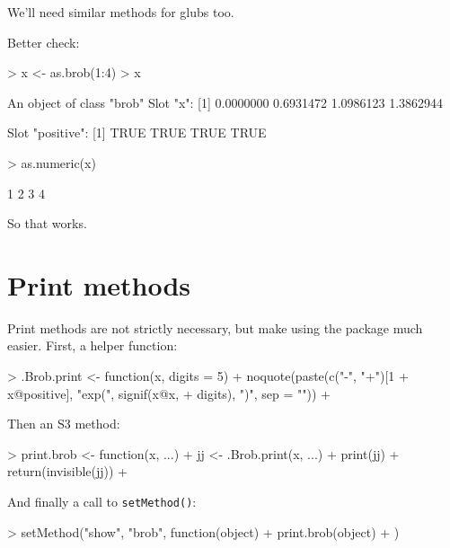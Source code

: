 \documentclass[a4paper]{article}
\begin{document}
We'll need similar methods for glubs too.


Better check:



\begin{Schunk}
\begin{Sinput}
> x <- as.brob(1:4)
> x
\end{Sinput}
\begin{Soutput}
An object of class "brob"
Slot "x":
[1] 0.0000000 0.6931472 1.0986123 1.3862944

Slot "positive":
[1] TRUE TRUE TRUE TRUE
\end{Soutput}
\begin{Sinput}
> as.numeric(x)
\end{Sinput}
\begin{Soutput}
[1] 1 2 3 4
\end{Soutput}
\end{Schunk}

So that works.

\section{Print methods}
Print methods are not strictly necessary, but make using the package
much easier.  First, a helper function:


\begin{Schunk}
\begin{Sinput}
> .Brob.print <- function(x, digits = 5) {
+     noquote(paste(c("-", "+")[1 + x@positive], "exp(", signif(x@x, 
+         digits), ")", sep = ""))
+ }
\end{Sinput}
\end{Schunk}

Then an S3 method:

\begin{Schunk}
\begin{Sinput}
> print.brob <- function(x, ...) {
+     jj <- .Brob.print(x, ...)
+     print(jj)
+     return(invisible(jj))
+ }
\end{Sinput}
\end{Schunk}

And finally a call to {\tt setMethod()}:

\begin{Schunk}
\begin{Sinput}
> setMethod("show", "brob", function(object) {
+     print.brob(object)
+ })
\end{Sinput}
\end{Schunk}
\end{document}
